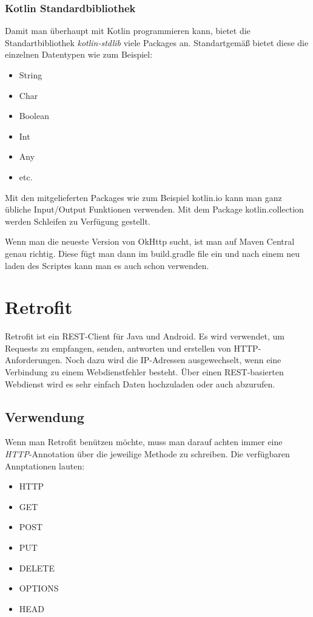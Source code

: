 \subsubsection{Kotlin Standardbibliothek}
\cite{Kotlin-Standartbibliothek}
Damit man überhaupt mit Kotlin programmieren kann, bietet die Standartbibliothek \textit{kotlin-stdlib} viele Packages an.
Standartgemäß bietet diese die einzelnen Datentypen wie zum Beispiel:

\begin{itemize}
    \item String
    \item Char
    \item Boolean
    \item Int
    \item Any
    \item etc.
\end{itemize}

Mit den mitgelieferten Packages wie zum Beispiel kotlin.io kann man ganz übliche Input/Output Funktionen verwenden.
Mit dem Package kotlin.collection werden Schleifen zu Verfügung gestellt.

Wenn man die neueste Version von OkHttp sucht, ist man auf Maven Central genau richtig.
Diese fügt man dann im build.gradle file ein und nach einem neu laden des Scriptes kann man es auch schon verwenden.

\section{Retrofit}
\cite{Retrofit}
\author{Bozidar Spasenovic}

Retrofit ist ein REST-Client für Java und Android.
Es wird verwendet, um Requests zu empfangen, senden, antworten und erstellen von HTTP-Anforderungen.
Noch dazu wird die IP-Adressen ausgewechselt, wenn eine Verbindung zu einem Webdienstfehler besteht.
Über einen REST-basierten Webdienst wird es sehr einfach Daten hochzuladen oder auch abzurufen. 

\subsection{Verwendung}
Wenn man Retrofit benützen möchte, muss man darauf achten immer eine \textit{HTTP}-Annotation über die jeweilige Methode
zu schreiben. Die verfügbaren Annptationen lauten:

\begin{itemize}
    \item HTTP
    \item GET
    \item POST
    \item PUT
    \item DELETE
    \item OPTIONS
    \item HEAD
\end{itemize}


